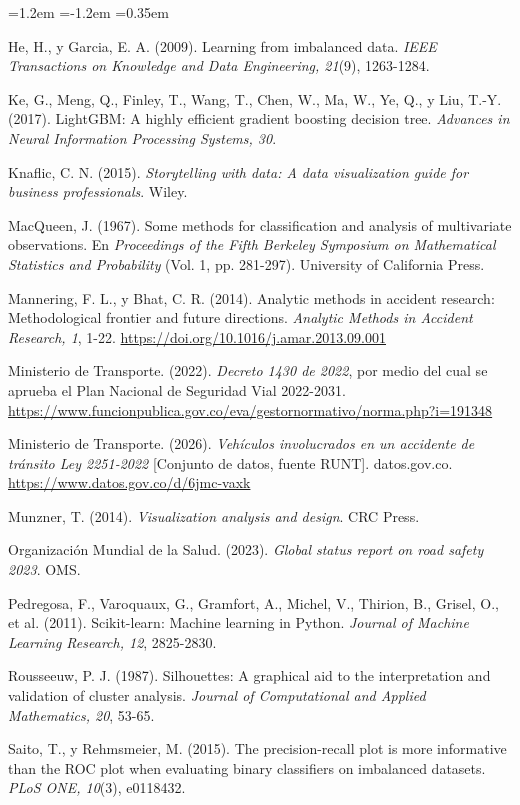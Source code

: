 \documentclass[11pt,a4paper]{article}
\begin{document}
\begin{list}{}{\leftmargin=1.2em \itemindent=-1.2em \itemsep=0.35em \parsep=0pt}
\item He, H., y Garcia, E. A. (2009). Learning from imbalanced data. \textit{IEEE Transactions on Knowledge and Data Engineering, 21}(9), 1263-1284.
\item Ke, G., Meng, Q., Finley, T., Wang, T., Chen, W., Ma, W., Ye, Q., y Liu, T.-Y. (2017). LightGBM: A highly efficient gradient boosting decision tree. \textit{Advances in Neural Information Processing Systems, 30}.
\item Knaflic, C. N. (2015). \textit{Storytelling with data: A data visualization guide for business professionals}. Wiley.
\item MacQueen, J. (1967). Some methods for classification and analysis of multivariate observations. En \textit{Proceedings of the Fifth Berkeley Symposium on Mathematical Statistics and Probability} (Vol. 1, pp. 281-297). University of California Press.
\item Mannering, F. L., y Bhat, C. R. (2014). Analytic methods in accident research: Methodological frontier and future directions. \textit{Analytic Methods in Accident Research, 1}, 1-22. \url{https://doi.org/10.1016/j.amar.2013.09.001}
\item Ministerio de Transporte. (2022). \textit{Decreto 1430 de 2022}, por medio del cual se aprueba el Plan Nacional de Seguridad Vial 2022-2031. \url{https://www.funcionpublica.gov.co/eva/gestornormativo/norma.php?i=191348}
\item Ministerio de Transporte. (2026). \textit{Vehículos involucrados en un accidente de tránsito Ley 2251-2022} [Conjunto de datos, fuente RUNT]. datos.gov.co. \url{https://www.datos.gov.co/d/6jmc-vaxk}
\item Munzner, T. (2014). \textit{Visualization analysis and design}. CRC Press.
\item Organización Mundial de la Salud. (2023). \textit{Global status report on road safety 2023}. OMS.
\item Pedregosa, F., Varoquaux, G., Gramfort, A., Michel, V., Thirion, B., Grisel, O., et al. (2011). Scikit-learn: Machine learning in Python. \textit{Journal of Machine Learning Research, 12}, 2825-2830.
\item Rousseeuw, P. J. (1987). Silhouettes: A graphical aid to the interpretation and validation of cluster analysis. \textit{Journal of Computational and Applied Mathematics, 20}, 53-65.
\item Saito, T., y Rehmsmeier, M. (2015). The precision-recall plot is more informative than the ROC plot when evaluating binary classifiers on imbalanced datasets. \textit{PLoS ONE, 10}(3), e0118432.

\end{list}
\end{document}
